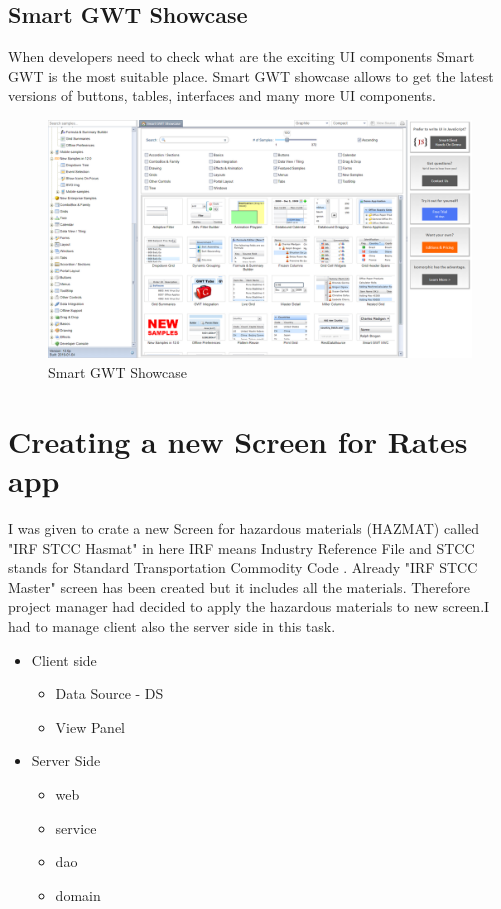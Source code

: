 \documentclass[12pt,a4paper]{report}
\begin{document}
\subsection*{Smart GWT Showcase}
When developers need to check what are the exciting UI components Smart GWT is the most suitable place. Smart GWT showcase allows to get the latest versions of buttons, tables, interfaces and many more UI components.
\begin{figure}[H]
\centering
\includegraphics[scale=.35]{SmartGWTShowcase.png}
  \caption{Smart GWT Showcase}
  \label{fig:SmartGWTShowcase}
\end{figure}

\section{Creating a new Screen for Rates app}
I was given to crate a new Screen for hazardous materials (HAZMAT) called "IRF STCC Hasmat" in here IRF means Industry Reference File and STCC stands for Standard Transportation Commodity Code . Already "IRF STCC Master" screen has been created but it includes all the materials. Therefore project manager had decided to apply the hazardous materials to new screen.I had to manage client also the server side in this task.
\begin{itemize}
\item Client side
	\begin{itemize}
	\item Data Source - DS
	\item View Panel
	\end{itemize}

\item Server Side
	\begin{itemize}
	\item web
	\item service
	\item dao
	\item domain
	\end{itemize}
\end{itemize}
\end{document}
